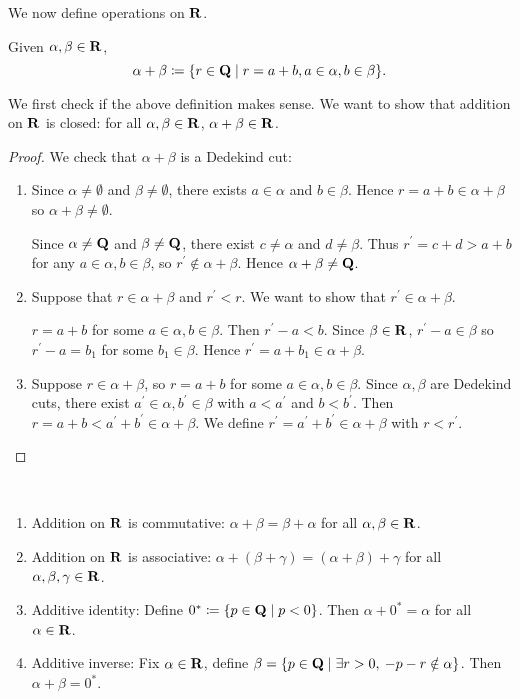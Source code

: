 We now define operations on $\mathbf R$.

\begin{definition}[Addition]
Given $\alpha,\beta\in\mathbf R$,
\[\alpha+\beta\coloneqq\{r\in\mathbf Q\mid r=a+b,a\in\alpha,b\in\beta\}.\]
\end{definition}

We first check if the above definition makes sense. We want to show that addition on $\mathbf R$ is closed: for all $\alpha,\beta\in\mathbf R$, $\alpha+\beta\in\mathbf R$.

\begin{proof}
We check that $\alpha+\beta$ is a Dedekind cut:
\begin{enumerate}[label=(\roman*)]
\item Since $\alpha\neq\emptyset$ and $\beta\neq\emptyset$, there exists $a\in\alpha$ and $b\in\beta$. Hence $r=a+b\in\alpha+\beta$ so $\alpha+\beta\neq\emptyset$.

Since $\alpha\neq\mathbf Q$ and $\beta\neq\mathbf Q$, there exist $c\neq\alpha$ and $d\neq\beta$. Thus $r^\prime=c+d>a+b$ for any $a\in\alpha,b\in\beta$, so $r^\prime\notin\alpha+\beta$. Hence $\alpha+\beta\neq\mathbf Q$.

\item Suppose that $r\in\alpha+\beta$ and $r^\prime<r$. We want to show that $r^\prime\in\alpha+\beta$.

$r=a+b$ for some $a\in\alpha,b\in\beta$. Then $r^\prime-a<b$. Since $\beta\in\mathbf R$, $r^\prime-a\in\beta$ so $r^\prime-a=b_1$ for some $b_1\in\beta$. Hence $r^\prime=a+b_1\in\alpha+\beta$.

\item Suppose $r\in\alpha+\beta$, so $r=a+b$ for some $a\in\alpha,b\in\beta$. Since $\alpha,\beta$ are Dedekind cuts, there exist $a^\prime\in\alpha,b^\prime\in\beta$ with $a<a^\prime$ and $b<b^\prime$. Then $r=a+b<a^\prime+b^\prime\in\alpha+\beta$. We define $r^\prime=a^\prime+b^\prime\in\alpha+\beta$ with $r<r^\prime$.
\end{enumerate}
\end{proof}

\begin{proposition} \
\begin{enumerate}[label=(\roman*)]
\item Addition on $\mathbf R$ is commutative: $\alpha+\beta=\beta+\alpha$ for all $\alpha,\beta\in\mathbf R$.
\item Addition on $\mathbf R$ is associative: $\alpha+(\beta+\gamma)=(\alpha+\beta)+\gamma$ for all $\alpha,\beta,\gamma\in\mathbf R$.
\item Additive identity: Define $0^*\coloneqq\{p\in\mathbf Q\mid p<0\}$. Then $\alpha+0^*=\alpha$ for all $\alpha\in\mathbf R$.
\item Additive inverse: Fix $\alpha\in\mathbf R$, define $\beta=\{p\in\mathbf Q\mid\exists r>0,\:-p-r\notin\alpha\}$. Then $\alpha+\beta=0^*$.
\end{enumerate}
\end{proposition}


